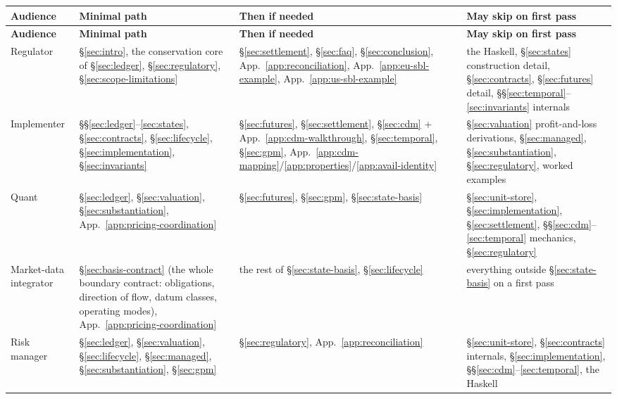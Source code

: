 \documentclass[11pt,a4paper]{article}
\begin{document}
\begin{longtable}{@{}p{}p{}p{}p{}@{}}
\toprule
\textbf{Audience} & \textbf{Minimal path} & \textbf{Then if needed} & \textbf{May skip on first pass} \\
\midrule
\endfirsthead
\toprule
\textbf{Audience} & \textbf{Minimal path} & \textbf{Then if needed} & \textbf{May skip on first pass} \\
\midrule
\endhead
\bottomrule
\endfoot
Regulator &
\S\ref{sec:intro}, the conservation core of \S\ref{sec:ledger}, \S\ref{sec:regulatory}, \S\ref{sec:scope-limitations} &
\S\ref{sec:settlement}, \S\ref{sec:faq}, \S\ref{sec:conclusion}, App.~\ref{app:reconciliation}, App.~\ref{app:eu-sbl-example}, App.~\ref{app:us-sbl-example} &
the Haskell, \S\ref{sec:states} construction detail, \S\ref{sec:contracts}, \S\ref{sec:futures} detail, \S\S\ref{sec:temporal}--\ref{sec:invariants} internals \\
\addlinespace
Implementer &
\S\S\ref{sec:ledger}--\ref{sec:states}, \S\ref{sec:contracts}, \S\ref{sec:lifecycle}, \S\ref{sec:implementation}, \S\ref{sec:invariants} &
\S\ref{sec:futures}, \S\ref{sec:settlement}, \S\ref{sec:cdm} + App.~\ref{app:cdm-walkthrough}, \S\ref{sec:temporal}, \S\ref{sec:gpm}, App.~\ref{app:cdm-mapping}/\ref{app:properties}/\ref{app:avail-identity} &
\S\ref{sec:valuation} profit-and-loss derivations, \S\ref{sec:managed}, \S\ref{sec:substantiation}, \S\ref{sec:regulatory}, worked examples \\
\addlinespace
Quant &
\S\ref{sec:ledger}, \S\ref{sec:valuation}, \S\ref{sec:substantiation}, App.~\ref{app:pricing-coordination} &
\S\ref{sec:futures}, \S\ref{sec:gpm}, \S\ref{sec:state-basis} &
\S\ref{sec:unit-store}, \S\ref{sec:implementation}, \S\ref{sec:settlement}, \S\S\ref{sec:cdm}--\ref{sec:temporal} mechanics, \S\ref{sec:regulatory} \\
\addlinespace
Market-data integrator &
\S\ref{sec:basis-contract} (the whole boundary contract: obligations, direction of flow, datum classes, operating modes), App.~\ref{app:pricing-coordination} &
the rest of \S\ref{sec:state-basis}, \S\ref{sec:lifecycle} &
everything outside \S\ref{sec:state-basis} on a first pass \\
\addlinespace
Risk manager &
\S\ref{sec:ledger}, \S\ref{sec:valuation}, \S\ref{sec:lifecycle}, \S\ref{sec:managed}, \S\ref{sec:substantiation}, \S\ref{sec:gpm} &
\S\ref{sec:regulatory}, App.~\ref{app:reconciliation} &
\S\ref{sec:unit-store}, \S\ref{sec:contracts} internals, \S\ref{sec:implementation}, \S\S\ref{sec:cdm}--\ref{sec:temporal}, the Haskell \\
\bottomrule
\end{longtable}
\end{document}
